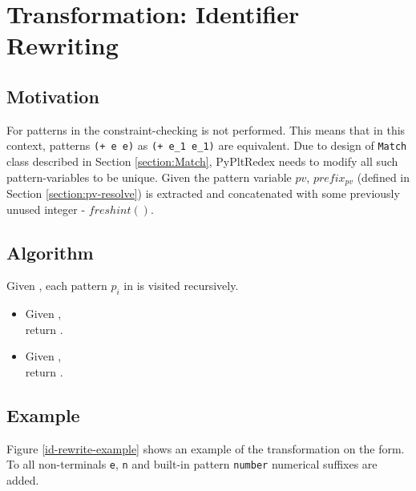 \section{Transformation: Identifier Rewriting}
\label{section:id-rewrite}

\subsection{Motivation}

For patterns in the \DefineLanguageNoArg \space constraint-checking is not performed. This means that in this context, patterns \texttt{(+ e e)} as \texttt{(+ e\_1 e\_1)} are equivalent. Due to design of \texttt{Match} class described in Section \ref{section:Match}, PyPltRedex needs to modify all such pattern-variables to be unique. Given the pattern variable $pv$, $\mathit{prefix_{pv}}$ (defined in Section \ref{section:pv-resolve}) is extracted and concatenated with some previously unused integer - $\mathit{freshint()}$.

\subsection{Algorithm}
Given , each pattern $p_i$ in \NtDefinitionN \space is visited recursively.
\begin{itemize}
\item Given \BuiltInPattern, \\ return .
\item Given \NonTerminal, \\ return .
\end{itemize}

\subsection{Example}

Figure \ref{id-rewrite-example} shows an example of the transformation on the \DefineLanguage form. To all non-terminals \texttt{e}, \texttt{n} and built-in pattern \texttt{number} numerical suffixes are added.

